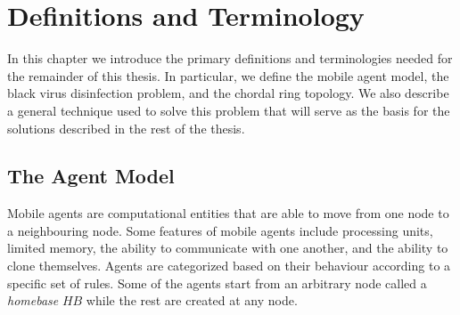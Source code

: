 \chapter {Definitions and Terminology}
\label{PM}

In this chapter we  introduce the primary definitions and terminologies needed for the remainder of this thesis.
In particular, we define the mobile agent model, the black virus  disinfection problem,  and the chordal ring topology. We also describe a general technique used to solve this problem that will serve as the basis for the solutions described in the rest of the thesis.
%
%



\section{The Agent Model} 


Mobile agents are computational entities that are able to move from one node to a neighbouring node. Some features of mobile agents include processing units, limited memory, the ability to communicate with one another, and the ability to clone themselves. Agents are categorized based on their behaviour according to a specific set of rules. Some of the agents start from an arbitrary node called a {\em homebase} $HB$  while the rest  are created  at any node. 
  

